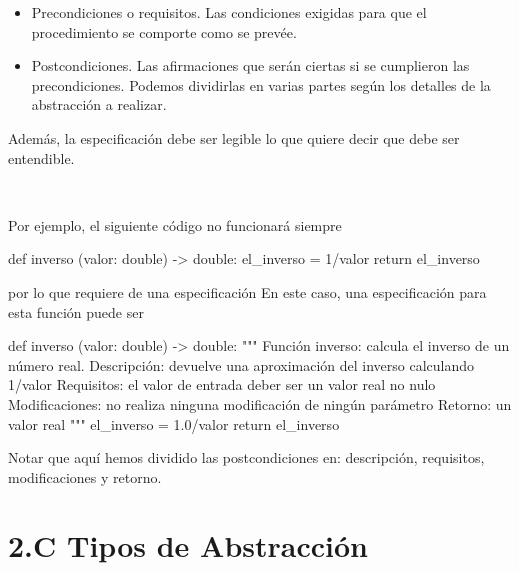 \begin{itemize}
\begin{itemize}
\begin{itemize}
\item Precondiciones o requisitos. Las condiciones exigidas para que el procedimiento se comporte como se prevée.
\item Postcondiciones. Las afirmaciones que serán ciertas si se cumplieron las precondiciones. Podemos dividirlas en varias partes según los detalles de la abstracción a realizar. 
\end{itemize}

\end{itemize}
Además, la especificación debe ser legible lo que quiere decir que debe ser entendible.


\


Por ejemplo, el siguiente código no funcionará siempre
\begin{pyverbatim}[frame=single]
def inverso (valor: double) -> double:
    el_inverso = 1/valor
    return el_inverso
\end{pyverbatim}

por lo que requiere de una especificación En este caso, una especificación para esta función puede ser
\begin{pyverbatim}[frame=single]
def inverso (valor: double) -> double:
    """
    Función inverso: calcula el inverso de un número real.
    Descripción: devuelve una aproximación del inverso calculando 1/valor
    Requisitos: el valor de entrada deber ser un valor real no nulo
    Modificaciones: no realiza ninguna modificación de ningún parámetro
    Retorno: un valor real
    """
    el_inverso = 1.0/valor
    return el_inverso
\end{pyverbatim}

Notar que aquí hemos dividido las postcondiciones en: descripción, requisitos, modificaciones y retorno.
\end{itemize}



\section*{2.C Tipos de Abstracción} \label{sec:tiposAbstraccion}


